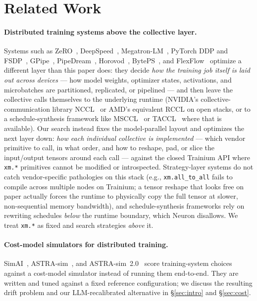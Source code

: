 \section{Related Work}
\label{sec:related}

\paragraph{Distributed training systems above the collective layer.}
Systems such as ZeRO~\cite{rajbhandari2020zero, ren2021zerooffload},
DeepSpeed~\cite{rasley2020deepspeed},
Megatron-LM~\cite{shoeybi2019megatron, korthikanti2023reducing,
narayanan2021efficient}, PyTorch DDP and
FSDP~\cite{li2020pytorch, zhao2023pytorchfsdp},
GPipe~\cite{huang2019gpipe}, PipeDream~\cite{narayanan2019pipedream},
Horovod~\cite{sergeev2018horovod}, BytePS~\cite{jiang2020byteps}, and
FlexFlow~\cite{jia2019flexflow} optimize a different layer than
this paper does: they decide \emph{how the training job itself is
laid out across devices} --- how model weights, optimizer states,
activations, and microbatches are partitioned, replicated, or
pipelined --- and then leave the collective calls themselves to
the underlying runtime (NVIDIA's collective-communication library
NCCL~\cite{nvidia_nccl} or AMD's equivalent RCCL on open stacks,
or to a schedule-synthesis framework like
MSCCL~\cite{cowan2022msccl} or TACCL~\cite{shah2023taccl} where
that is available). Our search instead fixes the model-parallel
layout and optimizes the next layer down: \emph{how each
individual collective is implemented} --- which vendor primitive
to call, in what order, and how to reshape, pad, or slice the
input/output tensors around each call --- against the closed
Trainium API where \texttt{xm.*} primitives cannot be modified or
introspected. Strategy-layer systems do not catch
vendor-specific pathologies on this stack (e.g.,
\texttt{xm.all\_to\_all} fails to compile across multiple nodes
on Trainium; a tensor reshape that looks free on paper actually
forces the runtime to physically copy the full tensor at slower,
non-sequential memory bandwidth), and schedule-synthesis
frameworks rely on rewriting schedules \emph{below} the runtime
boundary, which Neuron disallows. We treat \texttt{xm.*} as
fixed and search strategies \emph{above} it.

\paragraph{Cost-model simulators for distributed training.}
SimAI~\cite{wang2025simai},
ASTRA-sim~\cite{rashidi2020astrasim}, and
ASTRA-sim~2.0~\cite{won2023astrasim2} score training-system
choices against a cost-model simulator instead of running them
end-to-end. They are written and tuned against a fixed reference
configuration; we discuss the resulting drift problem and our
LLM-recalibrated alternative in \S\ref{sec:intro} and
\S\ref{sec:cost}.

